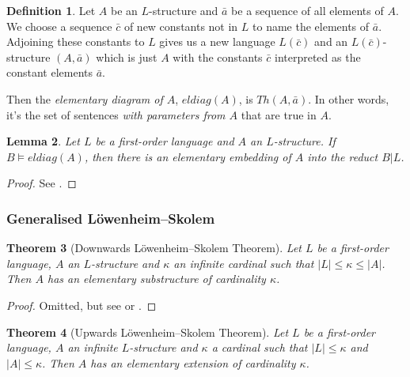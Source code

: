 \documentclass[10pt, a4paper, oneside]{article}
\newtheorem{thm}{Theorem}[section]
\theoremstyle{definition}
\newtheorem{dfn}[thm]{Definition}
\theoremstyle{remark}
\theoremstyle{plain}
\newtheorem{lem}[thm]{Lemma}
\theoremstyle{plain}
\begin{document}
\begin{dfn}
    Let $A$ be an $L$-structure and $\bar{a}$ be a sequence of all elements of
    $A$. We choose a sequence $\bar{c}$ of new constants not in $L$ to name the
    elements of $\bar{a}$. Adjoining these constants to $L$ gives us a new
    language $L(\bar{c})$ and an $L(\bar{c})$-structure $(A, \bar{a})$ which is
    just $A$ with the constants $\bar{c}$ interpreted as the constant elements
    $\bar{a}$.
    
    Then the \emph{elementary diagram of $A$}, $eldiag(A)$, is $Th(A, \bar{a})$.
    In other words, it's the set of sentences \emph{with parameters from $A$}
    that are true in $A$.
\end{dfn}

\begin{lem}
    \label{lem:eldiag_lem}
    Let $L$ be a first-order language and $A$ an $L$-structure. If $B \models
    eldiag(A)$, then there is an elementary embedding of $A$ into the reduct
    $B | L$.
\end{lem}

\begin{proof}
    See \citealt[p. 49]{hodges1997}.
\end{proof}

\subsubsection{Generalised Löwenheim--Skolem}

\begin{thm}[Downwards Löwenheim--Skolem Theorem]
    \label{thm:down_lst_gen}
    Let $L$ be a first-order language, $A$ an $L$-structure and $\kappa$ an
    infinite cardinal such that $|L| \leq \kappa \leq |A|$. Then $A$ has an
    elementary substructure of cardinality $\kappa$.
\end{thm}

\begin{proof}
    Omitted, but see \citet[pp. 69--72]{hodges1997} or
    \citet[p. 124]{vdalen2004}.
\end{proof}

\begin{thm}[Upwards Löwenheim--Skolem Theorem]
    \label{thm:up_lst_gen}
    Let $L$ be a first-order language, $A$ an infinite $L$-structure and
    $\kappa$ a cardinal such that $|L| \leq \kappa$ and $|A| \leq \kappa$. Then
    $A$ has an elementary extension of cardinality $\kappa$.
\end{thm}
\end{document}
